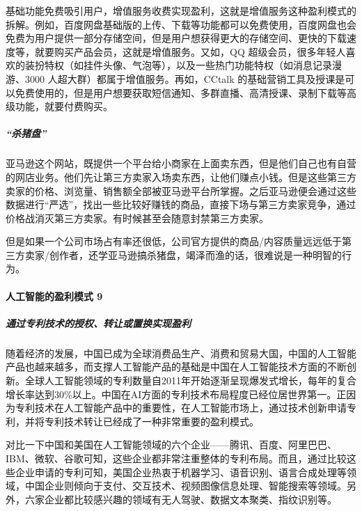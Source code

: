 \documentclass[letterpaper,11pt,english]{sphinxmanual}
\begin{document}
基础功能免费吸引用户，增值服务收费实现盈利，这就是增值服务这种盈利模式的拆解。例如，百度网盘基础版的上传、下载等功能都可以免费使用，百度网盘也会免费为用户提供一部分存储空间，但是用户想获得更大的存储空间、更快的下载速度等，就要购买产品会员，这就是增值服务。又如，QQ
超级会员，很多年轻人喜欢的装扮特权（如挂件头像、气泡等），以及一些热门功能特权（如消息记录漫游、3000
人超大群）都属于增值服务。再如，CCtalk
的基础营销工具及授课是可以免费使用的，但是用户想要获取短信通知、多群直播、高清授课、录制下载等高级功能，就要付费购买。


\subparagraph{“杀猪盘”}
\label{\detokenize{chapter_introduction/money:id14}}
亚马逊这个网站，既提供一个平台给小商家在上面卖东西，但是他们自己也有自营的网店业务。他们先让第三方卖家入场卖东西，让他们赚点小钱。但是这些第三方卖家的价格、浏览量、销售额全部被亚马逊平台所掌握。之后亚马逊便会通过这些数据进行“严选”，找出一些比较好赚钱的商品，直接下场与第三方卖家竞争，通过价格战消灭第三方卖家。有时候甚至会随意封禁第三方卖家。

但是如果一个公司市场占有率还很低，公司官方提供的商品/内容质量远远低于第三方卖家/创作者，还学亚马逊搞杀猪盘，竭泽而渔的话，很难说是一种明智的行为。


\paragraph{人工智能的盈利模式 9\sphinxfootnotemark[48]}
\label{\detokenize{chapter_introduction/money:id15}}%
\begin{footnotetext}[48]\sphinxAtStartFootnote
{}
%
\end{footnotetext}\ignorespaces 

\subparagraph{通过专利技术的授权、转让或置换实现盈利}
\label{\detokenize{chapter_introduction/money:id16}}
随着经济的发展，中国已成为全球消费品生产、消费和贸易大国，中国的人工智能产品也越来越多，而支撑人工智能产品的基础是中国在人工智能技术方面的不断创新。全球人工智能领域的专利数量自2011年开始逐渐呈现爆发式增长，每年的复合增长率达到30\%以上。中国在AI方面的专利技术布局程度已经位居世界第一。正因为专利技术在人工智能产品中的重要性，在人工智能市场上，通过技术创新申请专利，并将专利技术转让已经成了一种非常重要的盈利模式。

对比一下中国和美国在人工智能领域的六个企业——腾讯、百度、阿里巴巴、IBM、微软、谷歌可知，这些企业都非常注重整体的专利布局。而且，通过比较这些企业申请的专利可知，美国企业热衷于机器学习、语音识别、语言合成处理等领域，中国企业则倾向于支付、交互技术、视频图像信息处理、智能搜索等领域。另外，六家企业都比较感兴趣的领域有无人驾驶、数据文本聚类、指纹识别等。
\end{document}
